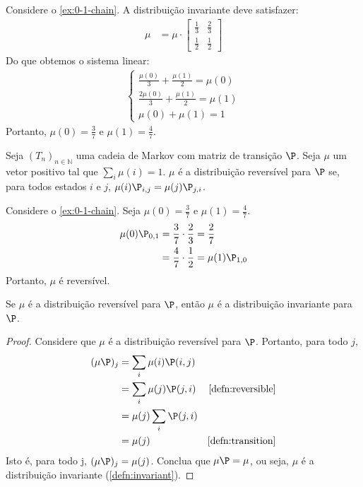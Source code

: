 \begin{example}
 Considere o \cref{ex:0-1-chain}.
 A distribuição invariante deve satisfazer:
 \begin{align*}
  \mu &=
  \mu \cdot \begin{bmatrix}
   \frac{1}{3} & \frac{2}{3} \\
   \frac{1}{2} & \frac{1}{2}
  \end{bmatrix}
 \end{align*}
 Do que obtemos o sistema linear:
 \begin{align*}
  \begin{cases}
   \frac{\mu(0)}{3}+\frac{\mu(1)}{2} = \mu(0) \\
   \frac{2\mu(0)}{3}+\frac{\mu(1)}{2} = \mu(1) \\
   \mu(0) + \mu(1) = 1
  \end{cases}
 \end{align*}
 Portanto, $\mu(0) = \frac{3}{7}$ e
 $\mu(1) = \frac{4}{7}$.
\end{example}
      
\begin{definition}
 \label{defn:reversible}
 Seja $(T_{n})_{n \in \mathbb{N}}$ uma
 cadeia de Markov com
 matriz de transição $\P$. 
 Seja $\mu$ um vetor positivo tal que
 $\sum_{i}{\mu(i)} = 1$. 
 $\mu$ é a distribuição reversível para
 $\P$ se,  para todos estados $i$ e $j$,
 $\mu(i)\P_{i,j} = \mu(j)\P_{j,i}$. 
\end{definition}
      
\begin{example}
 Considere o \cref{ex:0-1-chain}. 
 Seja $\mu(0) = \frac{3}{7}$ e
 $\mu(1) = \frac{4}{7}$.
 \begin{align*}
  \mu(0) \P_{0,1}
  &= \frac{3}{7} \cdot \frac{2}{3}
  = \frac{2}{7} \\
  &= \frac{4}{7} \cdot \frac{1}{2}
  = \mu(1)\P_{1,0}
 \end{align*}
 Portanto, $\mu$ é reversível.
\end{example}
      
\begin{lemma}
 \label{reversibility-implies-invariance}
 Se $\mu$ é a distribuição reversível para $\P$, 
 então $\mu$ é a distribuição invariante para $\P$. 
\end{lemma}
 
\begin{proof}
 Considere que $\mu$ é a distribuição reversível
 para $\P$. Portanto, para todo $j$,
 \begin{align*}
  (\mu \P)_{j}
  &= \sum_{i}{\mu(i)\P(i,j)} \\
  &= \sum_{i}{\mu(j)\P(j,i)}
  & \text{\cref{defn:reversible}} \\
  &= \mu(j)\sum_{i}{\P(j,i)} \\
  &= \mu(j)
  & \text{\cref{defn:transition}}
 \end{align*}
 Isto é, para todo j, $(\mu \P)_{j} = \mu(j)$.
 Conclua que $\mu \P = \mu$, ou seja,
 $\mu$ é a distribuição invariante
 (\cref{defn:invariant}).
\end{proof}

